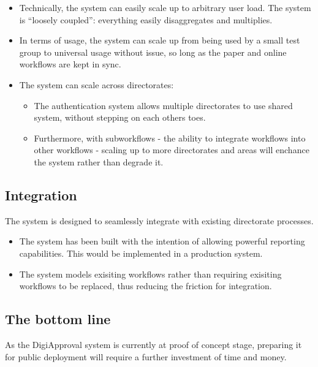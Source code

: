 \documentclass[12pt,a4paper,twosided]{article}
\begin{document}
\begin{itemize}

\item
  Technically, the system can easily scale up to arbitrary user load.
  The system is ``loosely coupled'': everything easily disaggregates and
  multiplies.
\item
  In terms of usage, the system can scale up from being used by a small
  test group to universal usage without issue, so long as the paper and
  online workflows are kept in sync.
\item
  The system can scale across directorates:

  \begin{itemize}
  
  \item
    The authentication system allows multiple directorates to use shared
    system, without stepping on each others toes.
  \item
    Furthermore, with subworkflows - the ability to integrate workflows
    into other workflows - scaling up to more directorates and areas
    will enchance the system rather than degrade it.
  \end{itemize}
\end{itemize}

\subsection{Integration}

The system is designed to seamlessly integrate with existing directorate
processes.

\begin{itemize}

\item
  The system has been built with the intention of allowing powerful
  reporting capabilities. This would be implemented in a production
  system.
\item
  The system models exisiting workflows rather than requiring exisiting
  workflows to be replaced, thus reducing the friction for integration.
\end{itemize}

\subsection{The bottom line}

As the DigiApproval system is currently at proof of concept stage,
preparing it for public deployment will require a further investment of
time and money.
\end{document}
